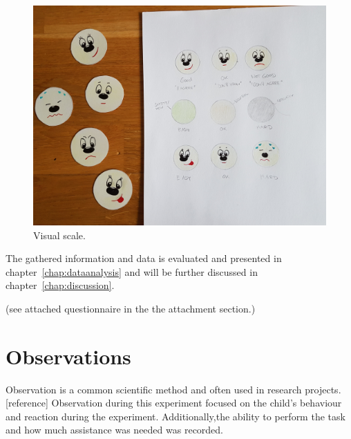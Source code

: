 \begin{figure}[h]  %
  \centering
  \includegraphics[width=.5\textwidth]{figures/scale.jpg}
  \caption[Visual scale.]{Visual scale.}
  \label{fig:setup}
\end{figure}

The gathered information and data is evaluated and presented in chapter~\ref{chap:dataanalysis} and will be further discussed in chapter~\ref{chap:discussion}.

(see attached questionnaire in the the attachment section.)



\section{Observations}

Observation is a common scientific method and often used in research projects.[reference] 
Observation during this experiment focused on the child's behaviour and reaction during the experiment. Additionally,the ability to perform the task and how much assistance was needed was recorded.